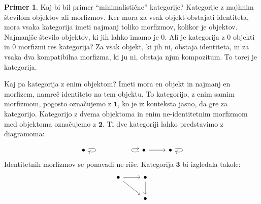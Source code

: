 \documentclass[12pt,a4paper]{book}
\theoremstyle{definition}
\theoremstyle{plain}
\theoremstyle{definition}
\newtheorem{primer}{Primer}[section]
\theoremstyle{remark}
\newcommand{\cat}[1]{\textbf{#1}}
\begin{document}
\begin{primer}
Kaj bi bil primer "`minimalistične"' kategorije? Kategorije z majhnim številom objektov ali morfizmov. Ker mora za vsak objekt obstajati identiteta, mora vsaka kategorija imeti najmanj toliko morfizmov, kolikor je objektov. Najmanjše število objektov, ki jih lahko imamo je $0$. Ali je kategorija z $0$ objekti in $0$ morfizmi res kategorija? Za vsak objekt, ki jih ni, obstaja identiteta, in za vsaka dva kompatibilna morfizma, ki ju ni, obstaja njun kompozitum. To torej je kategorija. 

Kaj pa kategorija z enim objektom? Imeti mora en objekt in najmanj en morfizem, namreč identiteto na tem objektu. To kategorijo, z enim samim morfizmom, pogosto označujemo z $\mathbf{1}$, ko je iz konteksta jasno, da gre za kategorijo. Kategorijo z dvema objektoma in enim ne-identitetnim morfizmom med objektoma označujemo z $\mathbf{2}$. Ti dve kategoriji lahko predstavimo z diagramoma:

\begin{equation}
\begin{tikzcd}
\bullet \arrow[loop right] &&&  \arrow[loop left] \bullet \arrow[r] & \bullet \arrow[loop right]
\end{tikzcd}
\end{equation}
%
Identitetnih morfizmov se ponavadi ne riše. Kategorija $\cat{3}$ bi izgledala takole:
%
\begin{equation}
\begin{tikzcd}
\bullet \arrow[r] \arrow[rd] & \bullet \arrow[d] \\
& \bullet
\end{tikzcd}
\end{equation}
\end{primer}
\end{document}
